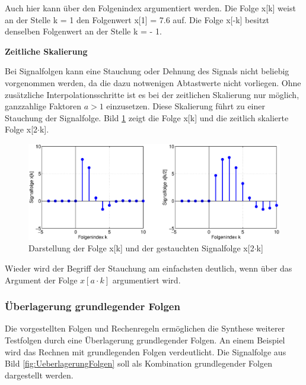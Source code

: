 \noindent Auch hier kann \"{u}ber den Folgenindex argumentiert werden. Die Folge x[k] weist an der Stelle k = 1 den Folgenwert x[1] = 7.6 auf. Die Folge x[-k] besitzt denselben Folgenwert an der Stelle k = - 1. \bigskip

{\selectfont
\noindent\textbf{Zeitliche Skalierung}} \smallskip

\noindent Bei Signalfolgen kann eine Stauchung oder Dehnung des Signals nicht beliebig vorgenommen werden, da die dazu notwenigen Abtastwerte nicht vorliegen. Ohne zus\"{a}tzliche Interpolationsschritte ist es bei der zeitlichen Skalierung nur m\"{o}glich, ganzzahlige Faktoren $a \mathrm{>} 1$ einzusetzen. Diese Skalierung f\"{u}hrt zu einer Stauchung der Signalfolge. Bild \ref{fig:StauchungFolgen} zeigt die Folge x[k] und die zeitlich skalierte Folge x[2$\cdot$k].

\begin{figure}[H]
  \centerline{\includegraphics[width=1\textwidth]{Kapitel3/Bilder/image17.eps}}
  \caption{Darstellung der Folge x[k] und der gestauchten Signalfolge x[2$\cdot$k]}
  \label{fig:StauchungFolgen}
\end{figure}

\noindent Wieder wird der Begriff der Stauchung am einfachsten deutlich, wenn \"{u}ber das Argument der Folge $x[a\cdot k]$ argumentiert wird.

\subsubsection{\"{U}berlagerung grundlegender Folgen}

\noindent Die vorgestellten Folgen und Rechenregeln erm\"{o}glichen die Synthese weiterer Testfolgen durch eine \"{U}berlagerung grundlegender Folgen. An einem Beispiel wird das Rechnen mit grundlegenden Folgen verdeutlicht. Die Signalfolge aus Bild \ref{fig:UeberlagerungFolgen} soll als Kombination grundlegender Folgen dargestellt werden.

